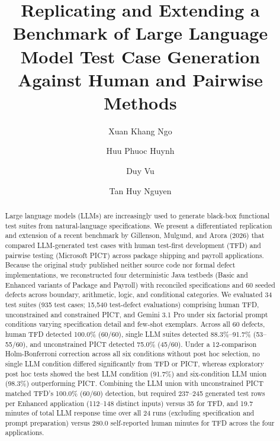 \documentclass[acmsmall]{acmart}
\begin{document}
\title[Benchmarking LLM Test Case Generation]{Replicating and Extending a Benchmark of Large Language Model Test Case Generation Against Human and Pairwise Methods}

\author{Xuan Khang Ngo}
\author{Huu Phuoc Huynh}
\author{Duy Vu}
\author{Tan Huy Nguyen}

\renewcommand{\shortauthors}{X. K. Ngo et al.}

\begin{abstract}
Large language models (LLMs) are increasingly used to generate black-box functional test suites from natural-language specifications. We present a differentiated replication and extension of a recent benchmark by Gillenson, Mulgund, and Arora (2026) that compared LLM-generated test cases with human test-first development (TFD) and pairwise testing (Microsoft PICT) across package shipping and payroll applications. Because the original study published neither source code nor formal defect implementations, we reconstructed four deterministic Java testbeds (Basic and Enhanced variants of Package and Payroll) with reconciled specifications and 60 seeded defects across boundary, arithmetic, logic, and conditional categories. We evaluated 34 test suites (935 test cases; 15,540 test-defect evaluations) comprising human TFD, unconstrained and constrained PICT, and Gemini 3.1 Pro under six factorial prompt conditions varying specification detail and few-shot exemplars. Across all 60 defects, human TFD detected 100.0\% (60/60), single LLM suites detected 88.3\%--91.7\% (53--55/60), and unconstrained PICT detected 75.0\% (45/60). Under a 12-comparison Holm-Bonferroni correction across all six conditions without post hoc selection, no single LLM condition differed significantly from TFD or PICT, whereas exploratory post hoc tests showed the best LLM condition (91.7\%) and six-condition LLM union (98.3\%) outperforming PICT. Combining the LLM union with unconstrained PICT matched TFD's 100.0\% (60/60) detection, but required 237--245 generated test rows per Enhanced application (112--148 distinct inputs) versus 35 for TFD, and 19.7 minutes of total LLM response time over all 24 runs (excluding specification and prompt preparation) versus 280.0 self-reported human minutes for TFD across the four applications.
\end{abstract}
\end{document}

